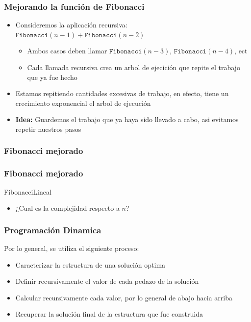 \documentclass{beamer}
\begin{document}
\begin{frame}
\frametitle{Mejorando la funci\'on de Fibonacci}
\begin{itemize}
    \item{Consideremos la aplicaci\'on recursiva: $\mathtt{Fibonacci}(n-1)+\mathtt{Fibonacci}(n-2)$
    \begin{itemize}
        \item{Ambos casos deben llamar $\mathtt{Fibonacci}(n-3)$, $\mathtt{Fibonacci}(n-4)$, ect}
        \item{Cada llamada recursiva crea un arbol de ejecici\'on que repite el trabajo que ya
        fue hecho}
    \end{itemize}
    }
    \item{Estamos repitiendo cantidades excesivas de trabajo, en efecto, tiene
    un crecimiento exponencial el arbol de ejecuci\'on}
    \item{{\bf Idea:} Guardemos el trabajo que ya haya sido llevado a cabo, asi
    evitamos repetir nuestros pasos}
\end{itemize}
\end{frame}

\begin{frame}
\frametitle{Fibonacci mejorado}
\end{frame}

\begin{frame}
    \frametitle{Fibonacci mejorado}
    \begin{algorithm}[H]
        \caption{FibonacciLineal}
        \begin{algorithmic}[1]
        \EndFor
        \EndProcedure
        \end{algorithmic}
    \end{algorithm}

    \begin{itemize}
        \item{¿Cual es la complejidad respecto a $n$?}
    \end{itemize}    

\end{frame}

\begin{frame}
\frametitle{Programaci\'on Dinamica}
Por lo general, se utiliza el siguiente proceso:
\begin{itemize}
    \item{Caracterizar la estructura de una soluci\'on optima}
    \item{Definir recursivamente el valor de cada pedazo de la soluci\'on}
    \item{Calcular recursivamente cada valor, por lo general de abajo hacia arriba}
    \item{Recuperar la soluci\'on final de la estructura que fue construida}
\end{itemize}
\end{frame}
\end{document}
